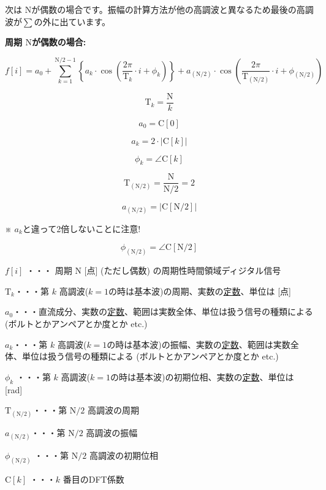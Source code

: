 \documentclass[a4paper]{jarticle}
\begin{document}
\newpage
次は $\textrm{N}$が偶数の場合です。振幅の計算方法が他の高調波と異なるため最後の高調波が$\sum$の外に出ています。

\begin{framed}
\noindent\quad \textbf{周期 $\textrm{N}$が偶数の場合:}

\[
f[i] = a_0 + \sum_{k=1}^{\textrm{N}/2-1}
\left \{
a_k \cdot \cos \left ( \frac{2\pi}{\textrm{T}_k} \cdot i + \phi_k \right )
\right \}
+
a_{(\textrm{N}/2)} \cdot \cos \left ( \frac{2\pi}{\textrm{T}_{(\textrm{N}/2)}} \cdot i + \phi_{(\textrm{N}/2)} \right )
\]

\[
\textrm{T}_k = \frac{\textrm{N}}{k}
\]

\[
a_0 = \textrm{C}[0]
\]

\[
a_k = 2 \cdot |\textrm{C}[k]| 
\]

\[
\phi_k = \angle \textrm{C}[k]
\]

\[
\textrm{T}_{(\textrm{N}/2)} = \frac{\textrm{N}}{\textrm{N}/2} = 2
\]

\[
a_{(\textrm{N}/2)} = |\textrm{C}[\textrm{N}/2]|  
\]
\begin{center}
※ $a_k$と違って2倍しないことに注意!
\end{center}

\[
\phi_{(\textrm{N}/2)} = \angle \textrm{C}[\textrm{N}/2]
\]

\bigskip
\noindent\quad $f[i]$ ・・・ 周期 $\textrm{N}$ [点] (ただし偶数) の周期性時間領域ディジタル信号

\bigskip
\noindent\quad $\textrm{T}_k$・・・第 $k$ 高調波($k=1$の時は基本波)の周期、実数の\underline{定数}、単位は [点]

\bigskip
\noindent\quad $a_0$・・・直流成分、実数の\underline{定数}、範囲は実数全体、単位は扱う信号の種類による (ボルトとかアンペアとか度とか etc.)

\bigskip
\noindent\quad $a_k$・・・第 $k$ 高調波($k=1$の時は基本波)の振幅、実数の\underline{定数}、範囲は実数全体、単位は扱う信号の種類による (ボルトとかアンペアとか度とか etc.)

\bigskip
\noindent\quad $\phi_k$ ・・・第 $k$ 高調波($k=1$の時は基本波)の初期位相、実数の\underline{定数}、単位は [rad]

\bigskip
\noindent\quad $\textrm{T}_{(\textrm{N}/2)}$・・・第 $\textrm{N}/2$ 高調波の周期

\bigskip
\noindent\quad $a_{(\textrm{N}/2)}$・・・第 $\textrm{N}/2$ 高調波の振幅

\bigskip
\noindent\quad $\phi_{(\textrm{N}/2)}$ ・・・第 $\textrm{N}/2$ 高調波の初期位相

\bigskip
\noindent\quad $\textrm{C}[k]$ ・・・$k$ 番目のDFT係数
\end{framed}
\end{document}
